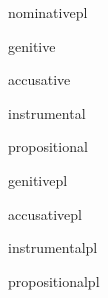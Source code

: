 \newcommand*\glstextfoot[1]{\glstext{#1}\footnote{\glstext{#1} --- \glsdesc{#1}}}

\glsaddkey%
{nominativepl}%
{}%
{\glsentrynominativepl}%
{\Glsentrynominativepl}%
{\glsnompl}%
{\Glsnompl}%
{\GLSnompl}%

\glsaddkey%
{genitive}%
{}%
{\glsentrygenitive}%
{\Glsentrygenitive}%
{\glsgen}%
{\Glsgen}%
{\GLSgen}%

\glsaddkey%
{accusative}%
{}%
{\glsentryaccusative}%
{\Glsentryaccusative}%
{\glsacc}%
{\Glsacc}%
{\GLSacc}%

\glsaddkey%
{instrumental}%
{}%
{\glsentryinstrumental}%
{\Glsentryinstrumental}%
{\glsinstr}%
{\Glsinstr}%
{\GLSinstr}%

\glsaddkey%
{propositional}%
{}%
{\glsentrypropositional}%
{\Glsentrypropositional}%
{\glsprop}%
{\Glsprop}%
{\GLSprop}%

\glsaddkey%
{genitivepl}%
{}%
{\glsentrygenitivepl}%
{\Glsentrygenitivepl}%
{\glsgenpl}%
{\Glsgenpl}%
{\GLSgenpl}%

\glsaddkey%
{accusativepl}%
{}%
{\glsentryaccusativepl}%
{\Glsentryaccusativepl}%
{\glsaccpl}%
{\Glsaccpl}%
{\GLSaccpl}%

\glsaddkey%
{instrumentalpl}%
{}%
{\glsentryinstrumentalpl}%
{\Glsentryinstrumentalpl}%
{\glsinstrpl}%
{\Glsinstrpl}%
{\GLSinstrpl}%

\glsaddkey%
{propositionalpl}%
{}%
{\glsentrypropositionalpl}%
{\Glsentrypropositionalpl}%
{\glsproppl}%
{\Glsproppl}%
{\GLSproppl}%

\newcommand\glsform[2][glsdesc]{%
  \ifglsused{#2}%
  {\glsdisp{#2}{\glstext{#2}}}%
  {\glsdisp{#2}{\csname#1\endcsname{#2} (\glstext{#2})}}%
}

